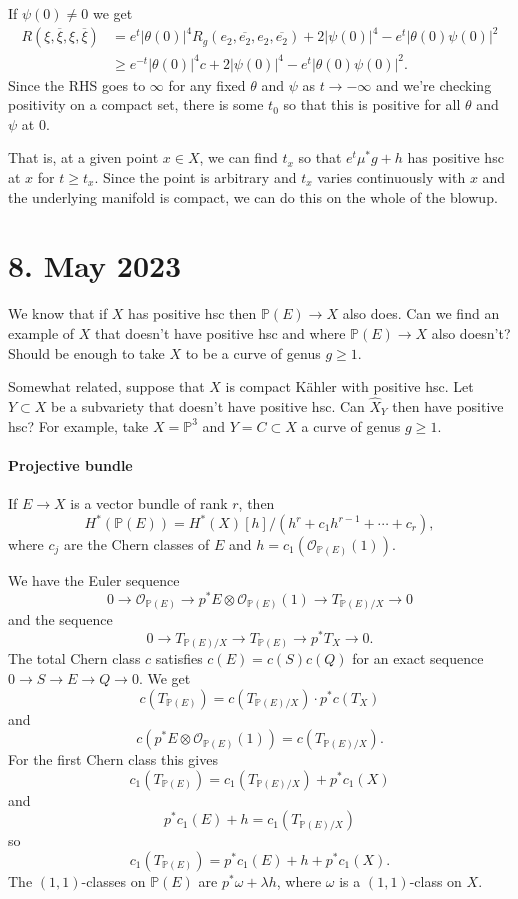 \documentclass[11pt]{article}
\theoremstyle{definition}
\newcommand{\kk}[1]{\mathbb{#1}}
\newcommand{\cc}[1]{\mathcal{#1}}
\def\ov#1{\overline{#1}}
\begin{document}
If $\psi(0) \not= 0$ we get
\begin{align*}
R(\xi, \ov\xi, \xi, \ov\xi)
&= e^t |\theta(0)|^4 R_g(e_2, \ov{e_2}, e_2, \ov{e_2})
+ 2 |\psi(0)|^4
- e^t |\theta(0) \psi(0)|^2
\\
&\geq
e^{-t} |\theta(0)|^4 c
+ 2 |\psi(0)|^4
- e^t |\theta(0) \psi(0)|^2.
\end{align*}
Since the RHS goes to $\infty$ for any fixed $\theta$ and $\psi$ as $t \to
-\infty$ and we're checking positivity on a compact set, there is some $t_0$
so that this is positive for all $\theta$ and $\psi$ at $0$.

That is, at a given point $x \in X$, we can find $t_x$ so that $e^t \mu^* g + h$
has positive hsc at $x$ for $t \geq t_x$.
Since the point is arbitrary and $t_x$ varies continuously with $x$ and the
underlying manifold is compact, we can do this on the whole of the blowup.



\section{8. May 2023}

We know that if $X$ has positive hsc then $\kk P(E) \to X$ also does.
Can we find an example of $X$ that doesn't have positive hsc and where $\kk
P(E) \to X$ also doesn't?
Should be enough to take $X$ to be a curve of genus $g \geq 1$.

Somewhat related, suppose that $X$ is compact K\"ahler with positive hsc.
Let $Y \subset X$ be a subvariety that doesn't have positive hsc.
Can $\widehat X_Y$ then have positive hsc?
For example, take $X = \kk P^3$ and $Y = C \subset X$ a curve of genus $g \geq 1$.


\paragraph{Projective bundle}

If $E \to X$ is a vector bundle of rank $r$, then
$$
H^*(\kk P(E))
= H^*(X)[h] / (h^{r} + c_1 h^{r-1} + \cdots + c_{r} ),
$$
where $c_j$ are the Chern classes of $E$ and $h = c_1(\cc O_{\kk P(E)}(1))$.

We have the Euler sequence
$$
0
\to \cc O_{\kk P(E)}
\to p^*E \otimes \cc O_{\kk P(E)}(1)
\to T_{\kk P(E)/X}
\to 0
$$
and the sequence
$$
0
\to T_{\kk P(E)/X}
\to T_{\kk P(E)}
\to p^* T_X
\to 0.
$$
The total Chern class $c$ satisfies $c(E) = c(S) c(Q)$ for an exact sequence $0
\to S \to E \to Q \to 0$.
We get
$$
c(T_{\kk P(E)}) = c(T_{\kk P(E)/X}) \cdot p^* c(T_X)
$$
and
$$
c(p^*E \otimes \cc O_{\kk P(E)}(1))
= c(T_{\kk P(E)/X}).
$$
For the first Chern class this gives
$$
c_1(T_{\kk P(E)})
= c_1(T_{\kk P(E)/X}) + p^* c_1(X)
$$
and
$$
p^*c_1(E) + h
= c_1(T_{\kk P(E)/X})
$$
so
$$
c_1(T_{\kk P(E)})
= p^*c_1(E) + h + p^* c_1(X).
$$
The $(1,1)$-classes on $\kk P(E)$ are $p^* \omega + \lambda h$, where $\omega$
is a $(1,1)$-class on $X$.
\end{document}
